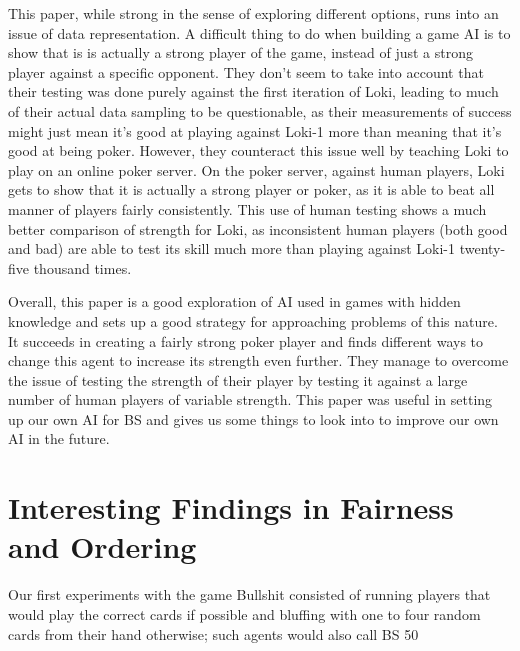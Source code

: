 \documentclass[a4paper,12pt]{article}
\begin{document}
	This paper, while strong in the sense of exploring different options, runs into an issue of data representation. A difficult thing to do when building a game AI is to show that is is actually a strong player of the game, instead of just a strong player against a specific opponent. They don’t seem to take into account that their testing was done purely against the first iteration of Loki, leading to much of their actual data sampling to be questionable, as their measurements of success might just mean it’s good at playing against Loki-1 more than meaning that it’s good at being poker. However, they counteract this issue well by teaching Loki to play on an online poker server. On the poker server, against human players, Loki gets to show that it is actually a strong player or poker, as it is able to beat all manner of players fairly consistently. This use of human testing shows a much better comparison of strength for Loki, as inconsistent human players (both good and bad) are able to test its skill much more than playing against Loki-1 twenty-five thousand times.

	Overall, this paper is a good exploration of AI used in games with hidden knowledge and sets up a good strategy for approaching problems of this nature. It succeeds in creating a fairly strong poker player and finds different ways to change this agent to increase its strength even further. They manage to overcome the issue of testing the strength of their player by testing it against a large number of human players of variable strength. This paper was useful in setting up our own AI for BS and gives us some things to look into to improve our own AI in the future.

\section{Interesting Findings in Fairness and Ordering}
	Our first experiments with the game Bullshit consisted of running players that would play the correct cards if possible and bluffing with one to four random cards from their hand otherwise; such agents would also call BS 50%
\end{document}
